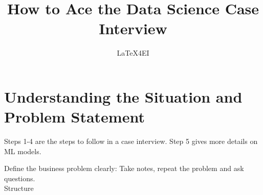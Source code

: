 \documentclass[english, threecolumn]{latex4ei/latex4ei_sheet}
\title{How to Ace the Data Science Case Interview }
\author{LaTeX4EI}					%
\begin{document}
\ifdefined\GitRevision{}\fi

\maketitle   %


\section{Understanding the Situation and Problem Statement}
\begin{sectionbox}
\begin{symbolbox}
Steps 1-4 are the steps to follow in a case interview. Step 5 gives more details on ML models.
\end{symbolbox}
    Define the business problem clearly: Take notes, repeat the problem and ask questions.\\
    Structure 
\end{sectionbox}
\end{document}
